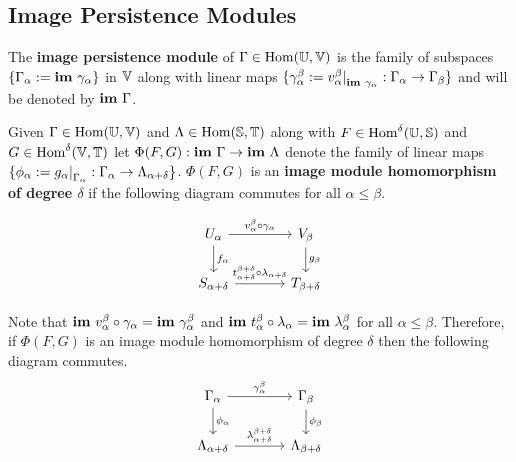 \subsection{Image Persistence Modules}

The \textbf{image persistence module} of $\Gamma\in\mathrm{Hom}(\mathbb{U},\mathbb{V})$ is the family of subspaces $\{\Gamma_\alpha :=\mathbf{im}~\gamma_\alpha\}$ in $\mathbb{V}$ along with linear maps $\{\gamma_\alpha^\beta := v_\alpha^\beta\mathord{\mid}_{\mathbf{im}~\gamma_\alpha} : \Gamma_\alpha\to\Gamma_\beta\}$ and will be denoted by $\mathbf{im}~\Gamma$.

Given $\Gamma\in\mathrm{Hom}(\mathbb{U},\mathbb{V})$ and $\Lambda\in\mathrm{Hom}(\mathbb{S},\mathbb{T})$ along with $F\in\mathrm{Hom}^\delta(\mathbb{U},\mathbb{S})$ and $G\in\mathrm{Hom}^\delta(\mathbb{V},\mathbb{T})$ let $\Phi(F, G) : \mathbf{im}~\Gamma\to\mathbf{im}~\Lambda$ denote the family of linear maps $\{\phi_\alpha := g_\alpha\mathord{\mid}_{\Gamma_\alpha} : \Gamma_\alpha\to\Lambda_{\alpha+\delta}\}$.
$\Phi(F, G)$ is an \textbf{image module homomorphism of degree $\delta$} if the following diagram commutes for all $\alpha\leq\beta$.

\begin{equation}\label{dgm:shifted_homomorphism}
  \begin{tikzcd}[column sep=large]
    U_\alpha\arrow{r}{v_\alpha^\beta\circ\gamma_\alpha}\arrow{d}{f_\alpha} &
    V_\beta\arrow{d}{g_\beta}\\
    S_{\alpha+\delta}\arrow{r}{t_{\alpha+\delta}^{\beta+\delta}\circ\lambda_{\alpha+\delta}} &
    T_{\beta +\delta}
\end{tikzcd}\end{equation}

Note that $\mathbf{im}~v_\alpha^\beta\circ\gamma_\alpha = \mathbf{im}~\gamma_\alpha^\beta$ and $\mathbf{im}~t_{\alpha}^{\beta}\circ\lambda_{\alpha} = \mathbf{im}~\lambda_\alpha^\beta$ for all $\alpha\leq\beta$.
Therefore, if $\Phi(F, G)$ is an image module homomorphism of degree $\delta$ then the following diagram commutes.
\begin{equation}\label{dgm:shifted_homomorphism}
  \begin{tikzcd}[column sep=large]
    \Gamma_\alpha\arrow{r}{\gamma_\alpha^\beta}\arrow{d}{\phi_\alpha} &
    \Gamma_\beta\arrow{d}{\phi_\beta}\\
    \Lambda_{\alpha+\delta}\arrow{r}{\lambda_{\alpha+\delta}^{\beta+\delta}} &
    \Lambda_{\beta +\delta}
\end{tikzcd}\end{equation}


